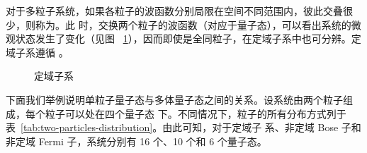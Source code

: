 对于多粒子系统，如果各粒子的波函数分别局限在空间不同范围内，彼此交叠很少，则称为。此
时，交换两个粒子的波函数（对应于量子态），可以看出系统的微观状态发生了变化（见图~%
\ref{fig:localized-sub-system}），因而即使是全同粒子，在定域子系中也可分辨。定域子系遵循
。

\begin{figure}[ht]
  \centering
  \FIGPLACEHOLDER
  \caption{定域子系}
  \label{fig:localized-sub-system}
\end{figure}

下面我们举例说明单粒子量子态与多体量子态之间的关系。设系统由两个粒子组成，每个粒子可以处在四个量子态
下。不同情况下，粒子的所有分布方式列于表~\ref{tab:two-particles-distribution}。由此可知，对于定域子
系、非定域 Bose 子和非定域 Fermi 子，系统分别有 16 个、10 个和 6 个量子态。

